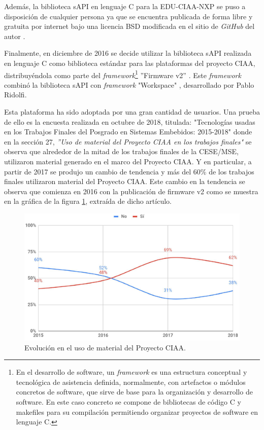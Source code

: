Además, la biblioteca sAPI en lenguaje C para la EDU-CIAA-NXP se puso a disposición de cualquier persona ya que se encuentra publicada de forma libre y gratuita por internet bajo una licencia BSD modificada \citep{BSD3clause} en el sitio de \emph{GitHub} del autor \citep{sAPIgit}.

Finalmente, en diciembre de 2016 se decide utilizar la biblioteca sAPI realizada en lenguaje C como biblioteca estándar para las plataformas del proyecto CIAA, distribuyéndola como parte del \emph{framework}\footnote{En el desarrollo de software, un \emph{framework} es una estructura conceptual y tecnológica de asistencia definida, normalmente, con artefactos o módulos concretos de software, que sirve de base para la organización y desarrollo de software. En este caso concreto se compone de bibliotecas de código C y makefiles para su compilación permitiendo organizar proyectos de software en lenguaje C.} ''Firmware v2'' \citep{ciaaFirmwareV2}. Este \emph{framework} combinó la biblioteca sAPI con \emph{framework} "Workspace" \citep{ws-ridolfi}, desarrollado por Pablo Ridolfi.

Esta plataforma ha sido adoptada por una gran cantidad de usuarios. Una prueba de ello es la encuesta realizada en octubre de 2018, titulada: "Tecnologías usadas en los Trabajos Finales del Posgrado en Sistemas Embebidos: 2015-2018" \citep{EncuestaCeseMse} donde en la sección 27, \emph{''Uso de material del Proyecto CIAA en los trabajos finales"} se observa que alrededor de la mitad de los trabajos finales de la CESE/MSE, utilizaron material generado en el marco del Proyecto CIAA. Y en particular, a partir de 2017 se produjo un cambio de tendencia y más del 60\% de los trabajos finales utilizaron material del Proyecto CIAA. Este cambio en la tendencia se observa que comienza en 2016 con la publicación de firmware v2 como se muestra en la gráfica de la figura \ref{fig:tendenciaMaterialCiaa}, extraída de dicho artículo.

\begin{figure}[!htbp]
\begin{center}  %
\includegraphics*[width=12cm]{Figures/TendenciaMaterialCiaa.png}
\par\caption{Evolución en el uso de material del Proyecto CIAA.}\label{fig:tendenciaMaterialCiaa}
\end{center}
\end{figure}

